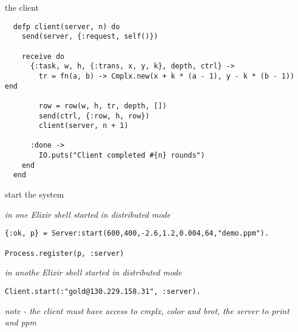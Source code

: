 \begin{frame}[fragile]{the client}

\begin{verbatim}
  defp client(server, n) do
    send(server, {:request, self()})

    receive do
      {:task, w, h, {:trans, x, y, k}, depth, ctrl} ->
        tr = fn(a, b) -> Cmplx.new(x + k * (a - 1), y - k * (b - 1))  end

        row = row(w, h, tr, depth, [])
        send(ctrl, {:row, h, row})
        client(server, n + 1)

      :done ->
        IO.puts("Client completed #{n} rounds") 
    end
  end
\end{verbatim}

\end{frame}

\begin{frame}[fragile]{start the system}

{\em in one Elixir shell started in distributed mode}

\begin{verbatim}
{:ok, p} = Server:start(600,400,-2.6,1.2,0.004,64,"demo.ppm").

Process.register(p, :server)
\end{verbatim}

{\em in anothe Elixir shell started in distributed mode}

\begin{verbatim}
Client.start(:"gold@130.229.158.31", :server).
\end{verbatim}

\vspace{20pt}
{\em note - the client must have access to cmplx, color and brot, the server to print and ppm}

\end{frame}





